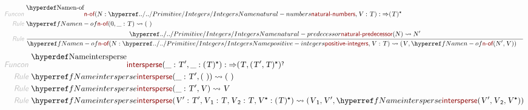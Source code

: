 \begin{align*}
  \KEY{Funcon} ~ 
  & \NAMEDECL{n-of}(\VAR{N} : \NAMEHYPER{../../Primitive}{Integers}{natural-numbers}, \VAR{V} : \VAR{T}) :  \TO ( \VAR{T} )\STAR
\\
  \KEY{Rule} ~ 
    & \NAMEREF{n-of}
        ( 0,   
          \_ : \VAR{T} ) \leadsto
        (  ~  )
\\
  \KEY{Rule} ~ 
    & \RULE{
      \NAMEHYPER{../../Primitive}{Integers}{natural-predecessor}
        ( \VAR{N} ) \leadsto
        \VAR{N}'
      }{
      & \NAMEREF{n-of}
          ( \VAR{N} : \NAMEHYPER{../../Primitive}{Integers}{positive-integers},   
            \VAR{V} : \VAR{T} ) \leadsto
          ( \VAR{V},  
            \NAMEREF{n-of}
              ( \VAR{N}',   
                \VAR{V} ) )
      }
\end{align*}
\begin{align*}
  \KEY{Funcon} ~ 
  & \NAMEDECL{intersperse}(\_ : \VAR{T}', \_ : ( \VAR{T} )\STAR) :  \TO ( \VAR{T},  
                                                                         ( \VAR{T}',  
                                                                           \VAR{T} )\STAR )\QUERY
\\
  \KEY{Rule} ~ 
    & \NAMEREF{intersperse}
        ( \_ : \VAR{T}',   
          (  ~  ) ) \leadsto
        (  ~  )
\\
  \KEY{Rule} ~ 
    & \NAMEREF{intersperse}
        ( \_ : \VAR{T}',   
          \VAR{V} ) \leadsto
        \VAR{V}
\\
  \KEY{Rule} ~ 
    & \NAMEREF{intersperse}
        ( \VAR{V}' : \VAR{T}',   
          \VAR{V}\SUB{1} : \VAR{T},   
          \VAR{V}\SUB{2} : \VAR{T},   
          \VAR{V}\STAR : ( \VAR{T} )\STAR ) \leadsto
        ( \VAR{V}\SUB{1},  
          \VAR{V}',  
          \NAMEREF{intersperse}
            ( \VAR{V}',   
              \VAR{V}\SUB{2},   
              \VAR{V}\STAR ) )
\end{align*}
